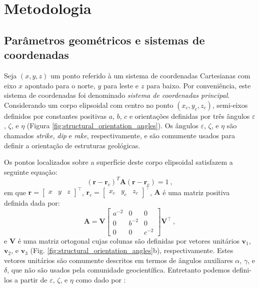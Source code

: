 \chapter{Metodologia}

\section{Parâmetros geométricos e sistemas de coordenadas}

Seja $(x, y, z)$ um ponto referido à um sistema de coordenadas Cartesianas com eixo $x$ apontado para o norte, $y$ para leste e $z$ para baixo. Por conveniência, este sistema de coordenadas foi denominado \textit{sistema de coordenadas principal}.
Considerando um corpo elipsoidal com centro no ponto $(x_{c}, y_{c}, z_{c})$, semi-eixos definidos por constantes positivas $a$, $b$, $c$ e orientações definidas por três ângulos $\varepsilon$, $\zeta$, e $\eta$ (Figura \ref{fig:structural_orientation_angles}). Os ângulos $\varepsilon$, $\zeta$, e $\eta$ são chamados \textit{strike}, \textit{dip} e \textit{rake}, respectivamente, e são comumente usados para definir a orientação de estruturas geológicas\citep{clark1986, allmendinger2012}. 

Os pontos localizados sobre a superfície deste corpo elipsoidal satisfazem a seguinte equação:
\begin{equation}
(\mathbf{r} - \mathbf{r}_c)^T \mathbf{A} (\mathbf{r} - \mathbf{r}_c) = 1 \: ,
\label{eq:ellipsoid_surface}
\end{equation}
em que $\mathbf{r} = [\begin{array}{ccc} x & y & z \end{array} ]^{\top}$,
$\mathbf{r}_{c} = [\begin{array}{ccc} x_{c} & y_{c} & z_{c} \end{array} ]^{\top}$,
$\mathbf{A}$ é uma matriz positiva definida dada por:
\begin{equation}
\mathbf{A} = \mathbf{V}
\left[ \begin{array}{ccc}
a^{-2} & 0 & 0 \\
0 & b^{-2} & 0 \\
0 & 0 & c^{-2} 
\end{array} \right] \mathbf{V}^{\top} \: ,
\label{eq:A}
\end{equation}
e $\mathbf{V}$ é uma matriz ortogonal cujas colunas são definidas por vetores unitários $\mathbf{v}_{1}$, $\mathbf{v}_{2}$, e $\mathbf{v}_{3}$ (Fig. \ref{fig:structural_orientation_angles}b), respectivamente. Estes vetores unitários são comumente descritos em termos de ângulos auxiliares $\alpha$, $\gamma$, e $\delta$, que não são usados pela comunidade geocientífica. Entretanto podemos defini-los a partir de $\varepsilon$, $\zeta$, e $\eta$ como dado por \citep{clark1986}:

